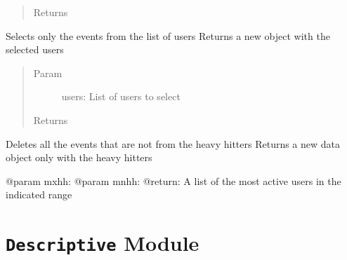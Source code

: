 \documentclass[letterpaper,10pt,english]{sphinxmanual}
\begin{document}
\begin{fulllineitems}
\begin{fulllineitems}
\begin{quote}
\begin{description}
\item[{Returns}] \leavevmode


\end{description}\end{quote}

\end{fulllineitems}


\begin{fulllineitems}
\label{index:SuperHub.Data.Data.select_data_users}
Selects only the events from the list of users
Returns a new object with the selected users
\begin{quote}\begin{description}
\item[{Param }] \leavevmode
users: List of users to select

\item[{Returns}] \leavevmode


\end{description}\end{quote}

\end{fulllineitems}


\begin{fulllineitems}
\label{index:SuperHub.Data.Data.select_heavy_hitters}
Deletes all the events that are not from the heavy hitters
Returns a new data object only with the heavy hitters

@param mxhh:
@param mnhh:
@return: A list of the most active users in the indicated range

\end{fulllineitems}


\begin{fulllineitems}
\label{index:SuperHub.Data.Data.wpath}
\end{fulllineitems}


\end{fulllineitems}



\chapter{\texttt{Descriptive} Module}
\label{index:module-SuperHub.Descriptive}\label{index:descriptive-module}\label{index:module-Descriptive}
\end{document}
